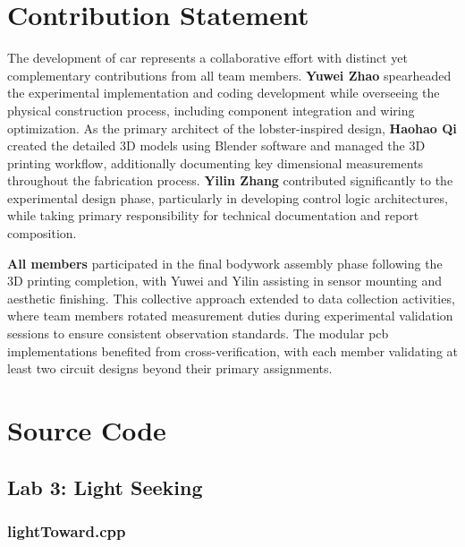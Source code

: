 \documentclass[../main]{subfiles}
\begin{document}
\chapter{Contribution Statement}
\label{ch:contribution-statement}

The development of \gls{car} represents a collaborative effort with distinct yet complementary contributions from all team members. \textbf{Yuwei Zhao} spearheaded the experimental implementation and coding development while overseeing the physical construction process, including component integration and wiring optimization. As the primary architect of the lobster-inspired design, \textbf{Haohao Qi} created the detailed 3D models using Blender software and managed the 3D printing workflow, additionally documenting key dimensional measurements throughout the fabrication process. \textbf{Yilin Zhang} contributed significantly to the experimental design phase, particularly in developing control logic architectures, while taking primary responsibility for technical documentation and report composition.

\textbf{All members} participated in the final bodywork assembly phase following the 3D printing completion, with Yuwei and Yilin assisting in sensor mounting and aesthetic finishing. This collective approach extended to data collection activities, where team members rotated measurement duties during experimental validation sessions to ensure consistent observation standards. The modular \gls{pcb} implementations benefited from cross-verification, with each member validating at least two circuit designs beyond their primary assignments.

\chapter{Source Code}
\label{ch:source-code}

%

\section{Lab 3: Light Seeking}

\subsection{lightToward.cpp}
\inputminted{cpp}{src/3-light/lightToward.cpp}
\end{document}
